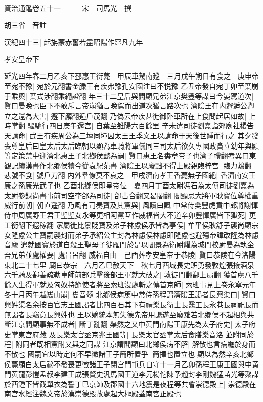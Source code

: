 資治通鑑卷五十一　　　宋　司馬光　撰

胡三省　音註

漢紀四十三|{
	起旃蒙赤奮若盡昭陽作噩凡九年}


孝安皇帝下

延光四年春二月乙亥下邳惠王衍薨　甲辰車駕南廵　三月戊午朔日有食之　庚申帝至宛不豫|{
	宛於元翻書金縢王有疾弗豫孔安國注曰不悦豫}
乙丑帝發自宛丁卯至葉崩于乘輿|{
	葉式涉翻乘繩證翻}
年三十二皇后與閻顯兄弟江京樊豐等謀曰今晏駕道次|{
	賢曰晏晚也臣下不敢斥言帝崩猶言晚駕而出道次猶言路次也}
濟隂王在内邂逅公卿立之還為大害|{
	邂下廨翻逅戶茂翻}
乃偽云帝疾甚徙御卧車所在上食問起居如故|{
	上時掌翻}
驅馳行四日庚午還宫|{
	自葉至雒陽六百餘里}
辛未遣司徒劉熹詣郊廟社稷告天請命|{
	武王冇疾周公為三壇同墠因太王王季文王以請命于天後世踵而行之}
其夕發喪尊皇后曰皇太后太后臨朝以顯為車騎將軍儀同三司太后欲久專國政貪立幼年與顯等定策禁中迎濟北惠王子北鄉侯懿為嗣|{
	賢曰惠王名夀章帝子也濟子禮翻考異曰東觀記續漢書作北鄉侯犢今從袁紀范書}
濟隂王以廢黜不得上殿親臨梓宫|{
	臨力鴆翻}
悲號不食|{
	號戶刀翻}
内外羣僚莫不哀之　甲戌濟南孝王香薨無子國絶|{
	香濟南安王康之孫康光武子也}
乙酉北鄉侯即皇帝位　夏四月丁酉太尉馮石為太傅司徒劉熹為太尉參録尚書事前司空李郃為司徒|{
	郃古合翻又曷閤翻}
閻顯忌大將軍耿寶位尊權重威行前朝|{
	朝直遥翻}
乃風有司奏寶及其黨與|{
	風讀曰諷}
中常侍樊豐虎賁中郎將謝惲侍中周廣野王君王聖聖女永等更相阿黨互作威福皆大不道辛卯豐惲廣皆下獄死|{
	更工衡翻下遐稼翻}
家屬徙比景貶寶及弟子林慮侯承皆為亭侯|{
	牟平侯耿舒子襲尚顯宗女隆慮公主寶嗣襲封而弟子承紹公主封為林慮侯林慮即隆慮也避殤帝諱改隆為林慮音廬}
遣就國寶於道自殺王聖母子徙雁門於是以閻景為衛尉耀為城門校尉晏為執金吾兄弟並處權要|{
	處昌呂翻}
威福自由　己酉葬孝安皇帝于恭陵|{
	賢曰恭陵在今洛陽東北二十七里}
廟曰恭宗　六月乙巳赦天下　秋七月西域長史班勇發敦煌張掖酒泉六千騎及鄯善疏勒車師前部兵擊後部王軍就大破之|{
	敦徒門翻鄯上扇翻}
獲首虜八千餘人生得軍就及匈奴持節使者將至索班沒處斬之傳首京師|{
	索班事見上卷永寧元年}
冬十月丙午越巂山崩|{
	巂音髓}
北鄉侯病篤中常侍孫程謂濟隂王謁者長興渠曰|{
	賢曰興姓渠名余按百官志王國謁者比四百石其下有禮樂長衛士長醫工長永巷長祠祀長而無謁者長竊意長興姓也}
王以嫡統本無失德先帝用讒遂至廢黜若北鄉侯不起相與共斷江京閻顯事無不成者|{
	斷丁亂翻}
渠然之又中黄門南陽王康先為太子府史|{
	太子府史掌東宫府藏}
及長樂太官丞京兆王國等|{
	長樂太官丞掌太后食膳樂音洛}
並附同於程|{
	附同者既相黨附又與之同謀}
江京謂閻顯曰北鄉侯病不解|{
	解散也言病纒於身而不散也}
國嗣宜以時定何不早徵諸王子簡所置乎|{
	簡擇也置立也}
顯以為然辛亥北鄉侯薨顯白太后祕不發喪更徵諸王子閉宫門屯兵自守十一月乙卯孫程王康王國與中黄門黄龍彭愷孟叔李建王成張賢史汎馬國王道李元楊佗陳予趙封李剛魏猛苖光等聚謀於西鍾下皆截單衣為誓丁巳京師及郡國十六地震是夜程等共會崇德殿上|{
	崇德殿在南宫水經注魏文帝於漢崇德殿故處起大極殿蓋南宮正殿也}
